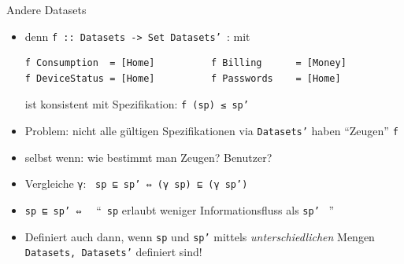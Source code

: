 \documentclass[18pt]{beamer}
\begin{document}
\begin{frame}[fragile]{Andere Datasets}
\begin{overprint}
\begin{center}
\end{center}


\begin{center}
\end{center}


\end{overprint}

\begin{overprint}
\begin{itemize}
  \item denn \texttt{f :: Datasets -> Set Datasets' }: mit
\begin{verbatim}
f Consumption  = [Home]          f Billing      = [Money]
f DeviceStatus = [Home]          f Passwords    = [Home]
\end{verbatim}
        ist konsistent mit Spezifikation: \texttt{f (sp) ≤ sp'}
\end{itemize}

\begin{itemize}
  \item Problem: nicht alle gültigen Spezifikationen via \texttt{Datasets'} haben \enquote{Zeugen} \texttt{f}
  \item selbst wenn: wie bestimmt man Zeugen? Benutzer?
\end{itemize}

\begin{itemize}
  \item Vergleiche \texttt{γ}: \ \texttt{sp  ⊑ sp'  ⇔ (γ sp) ⊑ (γ sp')}
  \item \texttt{sp  ⊑ sp'  ⇔ } \  \enquote{\ \texttt{sp} erlaubt weniger Informationsfluss als \texttt{sp'} \ }
  \item Definiert auch dann, wenn \texttt{sp} und \texttt{sp'} mittels  \emph{unterschiedlichen} Mengen \texttt{Datasets, Datasets'} definiert sind!
\end{itemize}
\end{overprint}

\end{frame}






\appendix
\beginbackup


\backupend
\end{document}
